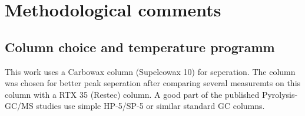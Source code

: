 % 
% 
% 
% 
% 
% 

\chapter{Methodological comments}

\section{Column choice and temperature programm}
This work uses a Carbowax column (Supelcowax 10) for seperation. The column was chosen for better peak seperation after comparing several measuremts on this column with a RTX 35 (Restec) column. A good part of the published Pyrolysis-GC/MS studies use simple HP-5/SP-5 or similar standard GC columns.


